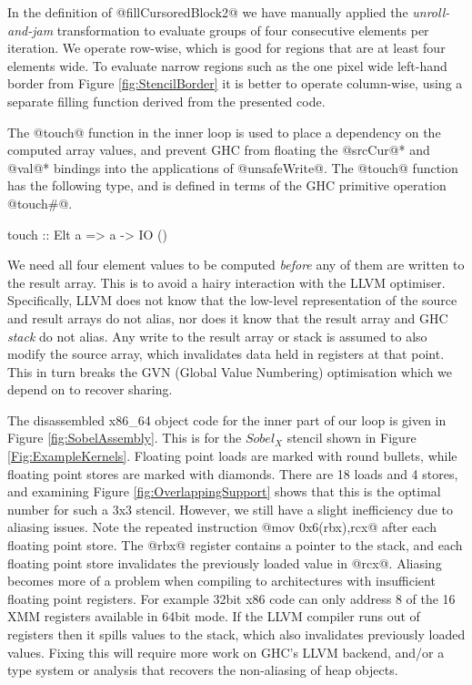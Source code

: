 In the definition of @fillCursoredBlock2@ we have manually applied the \mbox{\emph{unroll-and-jam}} transformation \cite{Carr:unroll-and-jam} to evaluate groups of four consecutive elements per iteration. We operate row-wise, which is good for regions that are at least four elements wide. To evaluate narrow regions such as the one pixel wide left-hand border from Figure \ref{fig:StencilBorder} it is better to operate column-wise, using a separate filling function derived from the presented code.

The @touch@ function in the inner loop is used to place a dependency on the computed array values, and prevent GHC from floating the @srcCur@* and @val@* bindings into the applications of @unsafeWrite@. The @touch@ function has the following type, and is defined in terms of the GHC primitive operation @touch#@. 

\begin{small}
\begin{code}
  touch :: Elt a => a -> IO ()
\end{code}
\end{small}

We need all four element values to be computed \emph{before} any of them are written to the result array. This is to avoid a hairy interaction with the LLVM optimiser. Specifically, LLVM does not know that the low-level representation of the source and result arrays do not alias, nor does it know that the result array and GHC \emph{stack} do not alias. Any write to the result array or stack is assumed to also modify the source array, which invalidates data held in registers at that point. This in turn breaks the GVN (Global Value Numbering) optimisation which we depend on to recover sharing.

The disassembled x86\_64 object code for the inner part of our loop is given in Figure \ref{fig:SobelAssembly}. This is for the $Sobel_X$ stencil shown in Figure \ref{Fig:ExampleKernels}. Floating point loads are marked with round bullets, while floating point stores are marked with diamonds. There are 18 loads and 4 stores, and examining Figure \ref{fig:OverlappingSupport} shows that this is the optimal number for such a 3x3 stencil. However, we still have a slight inefficiency due to aliasing issues. Note the repeated instruction @mov 0x6(rbx),rcx@ after each floating point store. The @rbx@ register contains a pointer to the stack, and each floating point store invalidates the previously loaded value in @rcx@. Aliasing becomes more of a problem when compiling to architectures with insufficient floating point registers. For example 32bit x86 code can only address 8 of the 16 XMM registers available in 64bit mode. If the LLVM compiler runs out of registers then it spills values to the stack, which also invalidates previously loaded values. Fixing this will require more work on GHC's LLVM backend, and/or a type system or analysis that recovers the non-aliasing of heap objects.

